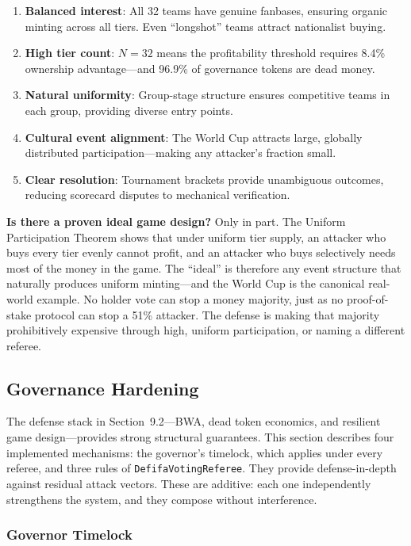 \documentclass[11pt,a4paper]{article}
\begin{document}
\begin{enumerate}[nosep]
\item \textbf{Balanced interest}: All 32 teams have genuine fanbases, ensuring organic minting across all tiers. Even ``longshot'' teams attract nationalist buying.
\item \textbf{High tier count}: $N = 32$ means the profitability threshold requires 8.4\% ownership advantage---and 96.9\% of governance tokens are dead money.
\item \textbf{Natural uniformity}: Group-stage structure ensures competitive teams in each group, providing diverse entry points.
\item \textbf{Cultural event alignment}: The World Cup attracts large, globally distributed participation---making any attacker's fraction small.
\item \textbf{Clear resolution}: Tournament brackets provide unambiguous outcomes, reducing scorecard disputes to mechanical verification.
\end{enumerate}

\textbf{Is there a proven ideal game design?} Only in part. The Uniform Participation Theorem shows that under uniform tier supply, an attacker who buys every tier evenly cannot profit, and an attacker who buys selectively needs most of the money in the game. The ``ideal'' is therefore any event structure that naturally produces uniform minting---and the World Cup is the canonical real-world example. No holder vote can stop a money majority, just as no proof-of-stake protocol can stop a 51\% attacker. The defense is making that majority prohibitively expensive through high, uniform participation, or naming a different referee.

\subsection{Governance Hardening}\label{sec:hardening}

The defense stack in Section~9.2---BWA, dead token economics, and resilient game design---provides strong structural guarantees. This section describes four implemented mechanisms: the governor's timelock, which applies under every referee, and three rules of \texttt{DefifaVotingReferee}. They provide defense-in-depth against residual attack vectors. These are additive: each one independently strengthens the system, and they compose without interference.

\subsubsection{Governor Timelock}
\end{document}

